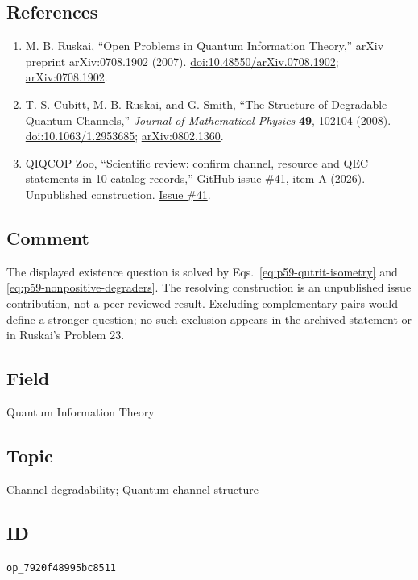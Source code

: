 \subsection*{References}

\begin{enumerate}[label={},leftmargin=4.8em,labelsep=0.5em]
  \footnotesize
  \item[\textup{[Rus07]}]\label{ref:p59-ruskai}
  M. B. Ruskai, ``Open Problems in Quantum Information Theory,''
  arXiv preprint arXiv:0708.1902 (2007).
  \newline
  \href{https://doi.org/10.48550/arXiv.0708.1902}{doi:10.48550/arXiv.0708.1902};
  \href{https://arxiv.org/abs/0708.1902}{arXiv:0708.1902}.

  \item[\textup{[CRS08]}]\label{ref:p59-cubitt-ruskai-smith}
  T. S. Cubitt, M. B. Ruskai, and G. Smith,
  ``The Structure of Degradable Quantum Channels,''
  \emph{Journal of Mathematical Physics} \textbf{49}, 102104 (2008).
  \href{https://doi.org/10.1063/1.2953685}{doi:10.1063/1.2953685};
  \href{https://arxiv.org/abs/0802.1360}{arXiv:0802.1360}.

  \item[\textup{[Rev26]}]\label{ref:p59-review-41}
  QIQCOP Zoo, “Scientific review: confirm channel, resource and QEC
statements in 10 catalog records,” GitHub issue \#41, item A (2026).
Unpublished construction.
\href{https://github.com/Naixu-Guo/quantum-open-problems/issues/41}{Issue \#41}.
\end{enumerate}

\subsection*{Comment}

The displayed existence question is solved by
Eqs.~\eqref{eq:p59-qutrit-isometry} and
\eqref{eq:p59-nonpositive-degraders}. The resolving construction is an
unpublished issue contribution, not a peer-reviewed result. Excluding
complementary pairs would define a stronger question; no such exclusion
appears in the archived statement or in Ruskai's Problem 23.

\subsection*{Field}

Quantum Information Theory

\subsection*{Topic}

Channel degradability; Quantum channel structure

\subsection*{ID}

\texttt{op\_7920f48995bc8511}
